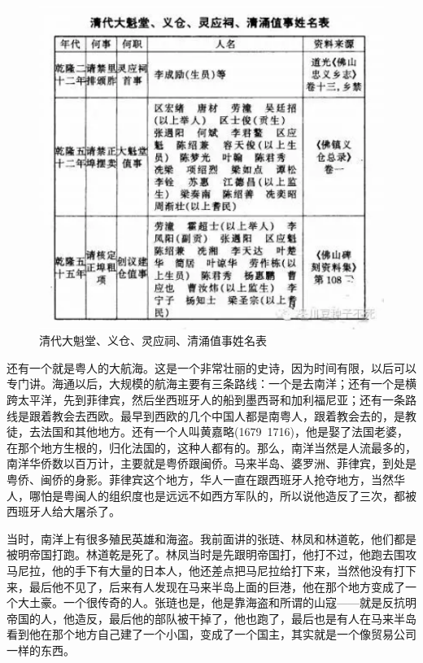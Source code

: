 \begin{figure}
	\centering
	\includegraphics[width=\textwidth]{images/image-66}
	\caption{清代大魁堂、义仓、灵应祠、清涌值事姓名表}
\end{figure}

还有一个就是粤人的大航海。这是一个非常壮丽的史诗，因为时间有限，以后可以专门讲。海通以后，大规模的航海主要有三条路线：一个是去南洋；还有一个是横跨太平洋，先到菲律宾，然后坐西班牙人的船到墨西哥和加利福尼亚；还有一条路线是跟着教会去西欧。最早到西欧的几个中国人都是南粤人，跟着教会去的，是教徒，去法国和其他地方。还有一个人叫黄嘉略(1679~1716)，他是娶了法国老婆，在那个地方生根的，归化法国的，这种人都有的。那么，南洋当然是人流最多的，南洋华侨数以百万计，主要就是粤侨跟闽侨。马来半岛、婆罗洲、菲律宾，到处是粤侨、闽侨的身影。菲律宾这个地方，华人一直在跟西班牙人抢夺地方，当然华人，哪怕是粤闽人的组织度也是远远不如西方军队的，所以说他造反了三次，都被西班牙人给大屠杀了。

当时，南洋上有很多殖民英雄和海盗。我前面讲的张琏、林凤和林道乾，他们都是被明帝国打跑。林道乾是死了。林凤当时是先跟明帝国打，他打不过，他跑去围攻马尼拉，他的手下有大量的日本人，他还差点把马尼拉给打下来，当然他没有打下来，最后他不见了，后来有人发现在马来半岛上面的巨港，他在那个地方变成了一个大土豪。一个很传奇的人。张琏也是，他是靠海盗和所谓的山寇——就是反抗明帝国的人，他造反，最后他的部队被干掉了，他也跑了，最后也是有人在马来半岛看到他在那个地方自己建了一个小国，变成了一个国主，其实就是一个像贸易公司一样的东西。

